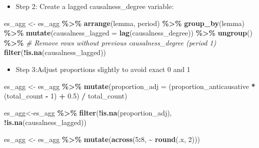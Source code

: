 \documentclass[
]{article}
\newenvironment{Shaded}{\begin{snugshade}}{\end{snugshade}}
\newcommand{\AttributeTok}[1]{\textcolor[rgb]{0.13,0.29,0.53}{#1}}
\newcommand{\CommentTok}[1]{\textcolor[rgb]{0.56,0.35,0.01}{\textit{#1}}}
\newcommand{\DecValTok}[1]{\textcolor[rgb]{0.00,0.00,0.81}{#1}}
\newcommand{\FloatTok}[1]{\textcolor[rgb]{0.00,0.00,0.81}{#1}}
\newcommand{\FunctionTok}[1]{\textcolor[rgb]{0.13,0.29,0.53}{\textbf{#1}}}
\newcommand{\NormalTok}[1]{#1}
\newcommand{\OtherTok}[1]{\textcolor[rgb]{0.56,0.35,0.01}{#1}}
\newcommand{\SpecialCharTok}[1]{\textcolor[rgb]{0.81,0.36,0.00}{\textbf{#1}}}
\providecommand{\tightlist}{%
  \setlength{\itemsep}{0pt}\setlength{\parskip}{0pt}}
\begin{document}
\begin{itemize}
\tightlist
\item
  Step 2: Create a lagged causalness\_degree variable:
\end{itemize}

\begin{Shaded}
\begin{Highlighting}[]
\NormalTok{es\_agg }\OtherTok{\textless{}{-}}\NormalTok{ es\_agg }\SpecialCharTok{\%\textgreater{}\%}
  \FunctionTok{arrange}\NormalTok{(lemma, period) }\SpecialCharTok{\%\textgreater{}\%}
  \FunctionTok{group\_by}\NormalTok{(lemma) }\SpecialCharTok{\%\textgreater{}\%}
  \FunctionTok{mutate}\NormalTok{(}\AttributeTok{causalness\_lagged =} \FunctionTok{lag}\NormalTok{(causalness\_degree)) }\SpecialCharTok{\%\textgreater{}\%}
  \FunctionTok{ungroup}\NormalTok{() }\SpecialCharTok{\%\textgreater{}\%}
  \CommentTok{\# Remove rows without previous causalness\_degree (period 1)}
  \FunctionTok{filter}\NormalTok{(}\SpecialCharTok{!}\FunctionTok{is.na}\NormalTok{(causalness\_lagged)) }
\end{Highlighting}
\end{Shaded}

\begin{itemize}
\tightlist
\item
  Step 3:Adjust proportions slightly to avoid exact 0 and 1
\end{itemize}

\begin{Shaded}
\begin{Highlighting}[]
\NormalTok{es\_agg }\OtherTok{\textless{}{-}}\NormalTok{ es\_agg }\SpecialCharTok{\%\textgreater{}\%}
  \FunctionTok{mutate}\NormalTok{(}\AttributeTok{proportion\_adj =}\NormalTok{ (proportion\_anticausative }\SpecialCharTok{*}\NormalTok{ (total\_count }\SpecialCharTok{{-}} \DecValTok{1}\NormalTok{) }\SpecialCharTok{+} \FloatTok{0.5}\NormalTok{) }\SpecialCharTok{/}\NormalTok{ total\_count)}

\NormalTok{es\_agg}\OtherTok{\textless{}{-}}\NormalTok{es\_agg }\SpecialCharTok{\%\textgreater{}\%}
  \FunctionTok{filter}\NormalTok{(}\SpecialCharTok{!}\FunctionTok{is.na}\NormalTok{(proportion\_adj), }\SpecialCharTok{!}\FunctionTok{is.na}\NormalTok{(causalness\_lagged))}

\NormalTok{es\_agg }\OtherTok{\textless{}{-}}\NormalTok{ es\_agg }\SpecialCharTok{\%\textgreater{}\%}
  \FunctionTok{mutate}\NormalTok{(}\FunctionTok{across}\NormalTok{(}\DecValTok{5}\SpecialCharTok{:}\DecValTok{8}\NormalTok{, }\SpecialCharTok{\textasciitilde{}} \FunctionTok{round}\NormalTok{(.x, }\DecValTok{2}\NormalTok{))) }
\end{Highlighting}
\end{Shaded}
\end{document}
